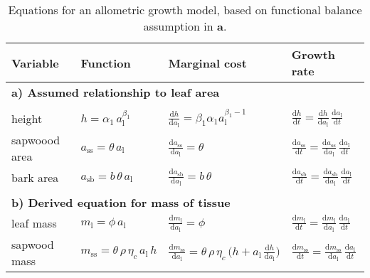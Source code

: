 \documentclass[12pt, a4paper]{article}
\begin{document}
\newpage

\begin{table}[ht]
\caption{Equations for an allometric growth model, based on functional balance assumption in {\textbf a}. }
\centering

{\footnotesize  %
 \begin{doublespace}
  \begin{tabular}{p{2.5cm}p{3.5cm}p{5cm}p{4cm} }\\ \hline
  Variable & Function & Marginal cost & Growth rate\\ \hline
  \multicolumn{4}{l}{\textbf{a) Assumed relationship to leaf area}} \\ \\
  height &
    $h = \alpha_1 \, a_\textrm{l}^{\beta_1}$ &
    $\frac{\textrm{d}h}{\textrm{d}a_\textrm{l}} =  \beta_1 \alpha_1 a_\textrm{l}^{\beta_1-1}$ &
    $\frac{\textrm{d}h}{\textrm{d}t}  = \frac{\textrm{d}h}{\textrm{d}a_\textrm{l}} \, \frac{\textrm{d}a_\textrm{l}}{\textrm{d}t}$ \\
  sapwoood area &
    $a_\textrm{ss} = \theta \, a_\textrm{l}$ &
    $\frac{\textrm{d}a_\textrm{ss}}{\textrm{d} a_\textrm{l}} = \theta$ &
    $\frac{\textrm{d}a_\textrm{ss}}{\textrm{d}t}  =\frac{\textrm{d}a_\textrm{ss}}{\textrm{d} a_\textrm{l}} \, \frac{\textrm{d}a_\textrm{l}}{\textrm{d}t}$ \\
  bark area &
    $a_\textrm{sb} = b \, \theta \, a_\textrm{l}$ &
    $\frac{\textrm{d}a_\textrm{sb}}{\textrm{d} a_\textrm{l}} = b \, \theta$ &
    $\frac{\textrm{d}a_\textrm{sb}}{\textrm{d}t} = \frac{\textrm{d}a_\textrm{sb}}{\textrm{d} a_\textrm{l}} \, \frac{\textrm{d}a_\textrm{l}}{\textrm{d}t}$ \\  \\
  \multicolumn{4}{l}{\textbf{b) Derived equation for mass of tissue }} \\
  leaf mass &
    $m_\textrm{l} = \phi \, a_\textrm{l} $ &
    $\frac{\textrm{d}m_\textrm{l}}{\textrm{d}a_\textrm{l}} = \phi$ &
    $\frac{\textrm{d}m_\textrm{l}}{\textrm{d}t}  = \frac{\textrm{d}m_\textrm{l}}{\textrm{d}a_\textrm{l}}  \, \frac{\textrm{d}a_\textrm{l}}{\textrm{d}t}$ \\
  sapwood mass &
    $m_\textrm{ss} = \theta \, \rho \, \eta_c \, a_\textrm{l} \, h $ &
    $\frac{\textrm{d}m_\textrm{ss}}{\textrm{d}a_\textrm{l}} = \theta\, \rho\, \eta_c\, \big( h + a_\textrm{l}\, \frac{\textrm{d}h}{\textrm{d}a_\textrm{l}} \big)$ &
    $\frac{\textrm{d}m_\textrm{ss}}{\textrm{d}t}  = \frac{\textrm{d}m_\textrm{ss}}{\textrm{d}a_\textrm{l}} \, \frac{\textrm{d}a_\textrm{l}}{\textrm{d}t}$ \\

\end{tabular}
\end{doublespace}}
\end{table}
\end{document}
